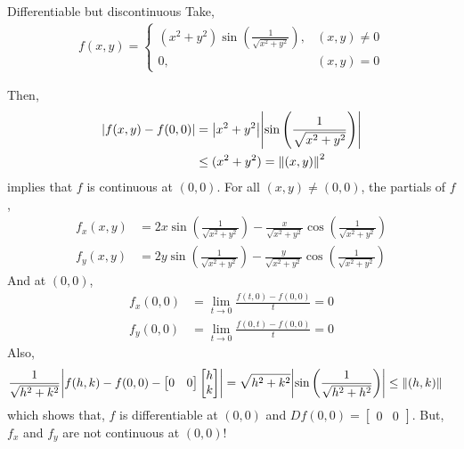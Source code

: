 \documentclass[../Analysis-3.tex]{subfiles}
\begin{document}
\begin{Eg}{Differentiable but discontinuous}{}
  Take, \begin{align*}
    f(x,y) = \begin{cases}
               \left( x^2+y^2 \right)\sin{\left( \frac{1}{\sqrt{x^2+y^2}} \right)}, & (x,y) \not= 0 \\
               0,                                                                   & (x,y) = 0
             \end{cases}
  \end{align*}
  
  Then, \begin{align*}
    \abs{f(x,y) - f(0,0)}
     & = \abs{x^2+y^2}\abs{\sin{\left( \frac{1}{\sqrt{x^2+y^2}} \right)}} \\
     & \leq (x^2+y^2) = \norm{(x,y)}^2
  \end{align*}
  implies that $ f $ is continuous at $ (0,0) $. For all $ (x,y) \not= (0,0) $, the partials of $ f $, \begin{align*}
    f_x(x,y) & = 2x\sin{\left( \frac{1}{\sqrt{x^2+y^2}} \right)} - \frac{x}{\sqrt{x^2+y^2}}\cos{\left( \frac{1}{\sqrt{x^2+y^2}} \right)} \\
    f_y(x,y) & = 2y\sin{\left( \frac{1}{\sqrt{x^2+y^2}} \right)} - \frac{y}{\sqrt{x^2+y^2}}\cos{\left( \frac{1}{\sqrt{x^2+y^2}} \right)}
  \end{align*}
  And at $(0,0)$, \begin{align*}
    f_x(0,0) & = \lim_{t \to 0} \frac{f(t,0) - f(0,0)}{t} = 0  \\
    f_y(0,0) & = \lim_{t \to 0} \frac{f(0,t) - f(0,0)}{t} = 0
  \end{align*}
  Also, \begin{align*}
    \frac{1}{\sqrt{h^2+k^2}}\abs{f(h,k) - f(0,0) - \begin{bmatrix} 0 & 0 \end{bmatrix}\begin{bmatrix} h \\ k \end{bmatrix}} & = \sqrt{h^2+k^2}\abs{\sin{\left( \frac{1}{\sqrt{h^2+h^2}} \right)}} \leq \norm{(h,k)}
  \end{align*}
  which shows that, $ f $ is differentiable at $ (0,0) $ and $ Df(0,0) = \begin{bmatrix} 0 & 0 \end{bmatrix} $. But, $ f_x $ and $ f_y $ are not continuous at $ (0,0) $!
\end{Eg}
\end{document}
